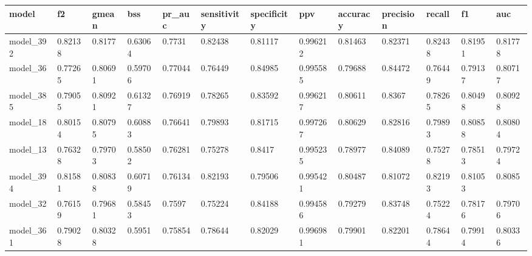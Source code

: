 \begin{tabular}{|l|l|l|l|l|l|l|l|l|l|l|l|l|}
\hline
\textbf{model} & \textbf{f2} & \textbf{gmean} & \textbf{bss} & \textbf{pr\_auc} & \textbf{sensitivity} & \textbf{specificity} & \textbf{ppv} & \textbf{accuracy} & \textbf{precision} & \textbf{recall} & \textbf{f1} & \textbf{auc} \\ \hline
model\_392     & 0.82138     & 0.8177         & 0.63064      & 0.7731           & 0.82438              & 0.81117              & 0.996212     & 0.81463           & 0.82371            & 0.82438         & 0.81951     & 0.81778      \\ \hline
model\_36      & 0.77265     & 0.80691        & 0.59706      & 0.77044          & 0.76449              & 0.84985              & 0.995585     & 0.79688           & 0.84472            & 0.76449         & 0.79137     & 0.80717      \\ \hline
model\_385     & 0.79055     & 0.80921        & 0.61327      & 0.76919          & 0.78265              & 0.83592              & 0.996217     & 0.80611           & 0.8367             & 0.78265         & 0.80498     & 0.80928      \\ \hline
model\_18      & 0.80154     & 0.80795        & 0.60883      & 0.76641          & 0.79893              & 0.81715              & 0.997267     & 0.80629           & 0.82816            & 0.79893         & 0.80858     & 0.80804      \\ \hline
model\_13      & 0.76328     & 0.79703        & 0.58502      & 0.76281          & 0.75278              & 0.8417               & 0.995235     & 0.78977           & 0.84089            & 0.75278         & 0.78513     & 0.79724      \\ \hline
model\_394     & 0.81581     & 0.80838        & 0.60719      & 0.76134          & 0.82193              & 0.79506              & 0.995421     & 0.80487           & 0.81072            & 0.82193         & 0.81053     & 0.8085       \\ \hline
model\_32      & 0.76159     & 0.79681        & 0.58453      & 0.7597           & 0.75224              & 0.84188              & 0.994586     & 0.79279           & 0.83748            & 0.75224         & 0.78176     & 0.79706      \\ \hline
model\_361     & 0.79028     & 0.80328        & 0.5951       & 0.75854          & 0.78644              & 0.82029              & 0.996981     & 0.79901           & 0.82201            & 0.78644         & 0.79914     & 0.80336      \\ \hline

\end{tabular}
